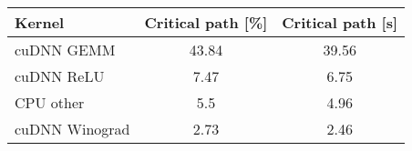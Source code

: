 

\begin{table}[]
\centering

\begin{tabular}{lcc}
\toprule
Kernel   & Critical path {[}\%{]} & Critical path {[}s{]} \\
\midrule
cuDNN GEMM      & 43.84                  & 39.56                  \\
cuDNN ReLU      & 7.47                   & 6.75                   \\
CPU other & 5.5                    & 4.96                   \\
cuDNN Winograd  & 2.73                   & 2.46       \\
\bottomrule
\end{tabular}

\end{table}